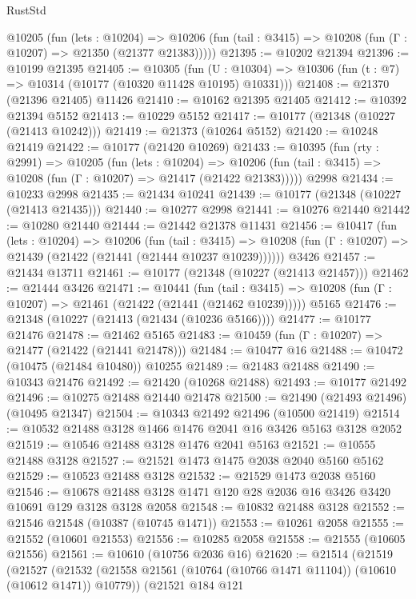 \begin{lexlean}{RustStd}
\begin{coremodule}
    @10205
      (fun (lets : @10204) =>
      @10206 (fun (tail : @3415) => @10208 (fun (Γ : @10207) => @21350 (@21377 @21383)))))
@21395 := @10202 @21394
@21396 := @10199 @21395
@21405 := @10305
    (fun (U : @10304) => @10306 (fun (t : @7) => @10314 (@10177 (@10320 @11428 @10195) @10331)))
@21408 := @21370 (@21396 @21405) @11426
@21410 := @10162 @21395 @21405
@21412 := @10392 @21394 @5152
@21413 := @10229 @5152
@21417 := @10177 (@21348 (@10227 (@21413 @10242)))
@21419 := @21373 (@10264 @5152)
@21420 := @10248 @21419
@21422 := @10177 (@21420 @10269)
@21433 := @10395
    (fun (rty : @2991) =>
    @10205
      (fun (lets : @10204) =>
      @10206 (fun (tail : @3415) => @10208 (fun (Γ : @10207) => @21417 (@21422 @21383)))))
    @2998
@21434 := @10233 @2998
@21435 := @21434 @10241
@21439 := @10177 (@21348 (@10227 (@21413 @21435)))
@21440 := @10277 @2998
@21441 := @10276 @21440
@21442 := @10280 @21440
@21444 := @21442 @21378 @11431
@21456 := @10417
    (fun (lets : @10204) =>
    @10206
      (fun (tail : @3415) =>
      @10208 (fun (Γ : @10207) => @21439 (@21422 (@21441 (@21444 @10237 @10239))))))
    @3426
@21457 := @21434 @13711
@21461 := @10177 (@21348 (@10227 (@21413 @21457)))
@21462 := @21444 @3426
@21471 := @10441
    (fun (tail : @3415) => @10208 (fun (Γ : @10207) => @21461 (@21422 (@21441 (@21462 @10239)))))
    @5165
@21476 := @21348 (@10227 (@21413 (@21434 (@10236 @5166))))
@21477 := @10177 @21476
@21478 := @21462 @5165
@21483 := @10459 (fun (Γ : @10207) => @21477 (@21422 (@21441 @21478)))
@21484 := @10477 @16
@21488 := @10472 (@10475 (@21484 @10480)) @10255
@21489 := @21483 @21488
@21490 := @10343 @21476
@21492 := @21420 (@10268 @21488)
@21493 := @10177 @21492
@21496 := @10275 @21488 @21440 @21478
@21500 := @21490 (@21493 @21496) (@10495 @21347)
@21504 := @10343 @21492 @21496 (@10500 @21419)
@21514 := @10532 @21488 @3128 @1466 @1476 @2041 @16 @3426 @5163 @3128 @2052
@21519 := @10546 @21488 @3128 @1476 @2041 @5163
@21521 := @10555 @21488 @3128
@21527 := @21521 @1473 @1475 @2038 @2040 @5160 @5162
@21529 := @10523 @21488 @3128
@21532 := @21529 @1473 @2038 @5160
@21546 := @10678 @21488 @3128 @1471 @120 @28 @2036 @16 @3426 @3420 @10691 @129 @3128 @3128 @2058
@21548 := @10832 @21488 @3128
@21552 := @21546 @21548 (@10387 (@10745 @1471))
@21553 := @10261 @2058
@21555 := @21552 (@10601 @21553)
@21556 := @10285 @2058
@21558 := @21555 (@10605 @21556)
@21561 := @10610 (@10756 @2036 @16)
@21620 := @21514
    (@21519
      (@21527
        (@21532 (@21558 @21561 (@10764 (@10766 @1471 @11104)) (@10610 (@10612 @1471)) @10779))
        (@21521
          @184
          @121

\end{coremodule}
\end{lexlean}
